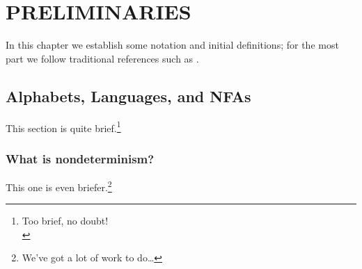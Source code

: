 \chapter{PRELIMINARIES}		\label{preliminaries}

In this chapter we establish some notation and initial definitions;
for the most part we follow traditional references such as \cite{hu79}.

\section{Alphabets, Languages, and NFAs}

This section is quite brief.\footnote{Too brief, no doubt! \\}

\subsection{What is nondeterminism?}

This one is even briefer.\footnote{We've got a lot of work to do\ldots}

